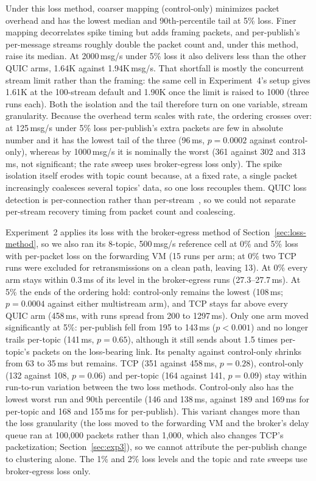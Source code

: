 \documentclass[a4paper,fleqn]{cas-dc}
\begin{document}
Under this loss method, coarser mapping (control-only) minimizes packet overhead and has the lowest median and 90th-percentile tail at 5\% loss. Finer mapping decorrelates spike timing but adds framing packets, and per-publish's per-message streams roughly double the packet count and, under this method, raise its median. At 2000\,msg/s under 5\% loss it also delivers less than the other QUIC arms, 1.64K against 1.94K\,msg/s. That shortfall is mostly the concurrent stream limit rather than the framing: the same cell in Experiment~4's setup gives 1.61K at the 100-stream default and 1.90K once the limit is raised to 1000 (three runs each). Both the isolation and the tail therefore turn on one variable, stream granularity. Because the overhead term scales with rate, the ordering crosses over: at 125\,msg/s under 5\% loss per-publish's extra packets are few in absolute number and it has the lowest tail of the three (96\,ms, $p=0.0002$ against control-only), whereas by 1000\,msg/s it is nominally the worst (361 against 302 and 313\,ms, not significant; the rate sweep uses broker-egress loss only). The spike isolation itself erodes with topic count because, at a fixed rate, a single packet increasingly coalesces several topics' data, so one loss recouples them. QUIC loss detection is per-connection rather than per-stream~\cite{rfc9002}, so we could not separate per-stream recovery timing from packet count and coalescing.

Experiment~2 applies its loss with the broker-egress method of Section~\ref{sec:loss-method}, so we also ran its 8-topic, 500\,msg/s reference cell at 0\% and 5\% loss with per-packet loss on the forwarding VM (15 runs per arm; at 0\% two TCP runs were excluded for retransmissions on a clean path, leaving 13). At 0\% every arm stays within 0.3\,ms of its level in the broker-egress runs (27.3--27.7\,ms). At 5\% the ends of the ordering hold: control-only remains the lowest (108\,ms; $p=0.0004$ against either multistream arm), and TCP stays far above every QUIC arm (458\,ms, with runs spread from 200 to 1297\,ms). Only one arm moved significantly at 5\%: per-publish fell from 195 to 143\,ms ($p<0.001$) and no longer trails per-topic (141\,ms, $p=0.65$), although it still sends about 1.5 times per-topic's packets on the loss-bearing link. Its penalty against control-only shrinks from 63 to 35\,ms but remains. TCP (351 against 458\,ms, $p=0.28$), control-only (132 against 108, $p=0.06$) and per-topic (164 against 141, $p=0.09$) stay within run-to-run variation between the two loss methods. Control-only also has the lowest worst run and 90th percentile (146 and 138\,ms, against 189 and 169\,ms for per-topic and 168 and 155\,ms for per-publish). This variant changes more than the loss granularity (the loss moved to the forwarding VM and the broker's delay queue ran at 100{,}000 packets rather than 1{,}000, which also changes TCP's packetization; Section~\ref{sec:exp3}), so we cannot attribute the per-publish change to clustering alone. The 1\% and 2\% loss levels and the topic and rate sweeps use broker-egress loss only.
\end{document}
